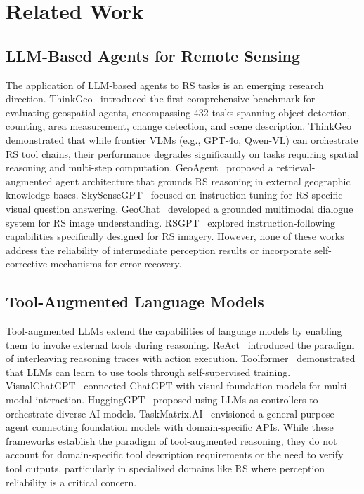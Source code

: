 \documentclass[journal]{IEEEtran}
\begin{document}
\section{Related Work}
\label{sec:related_work}

\subsection{LLM-Based Agents for Remote Sensing}

The application of LLM-based agents to RS tasks is an emerging research direction.
ThinkGeo~\cite{ThinkGeo} introduced the first comprehensive benchmark for evaluating geospatial agents, encompassing 432 tasks spanning object detection, counting, area measurement, change detection, and scene description.
ThinkGeo demonstrated that while frontier VLMs (e.g., GPT-4o, Qwen-VL) can orchestrate RS tool chains, their performance degrades significantly on tasks requiring spatial reasoning and multi-step computation.
GeoAgent~\cite{GeoAgent} proposed a retrieval-augmented agent architecture that grounds RS reasoning in external geographic knowledge bases.
SkySenseGPT~\cite{SkySenseGPT} focused on instruction tuning for RS-specific visual question answering.
GeoChat~\cite{GeoChat} developed a grounded multimodal dialogue system for RS image understanding.
RSGPT~\cite{RSGPT} explored instruction-following capabilities specifically designed for RS imagery.
However, none of these works address the reliability of intermediate perception results or incorporate self-corrective mechanisms for error recovery.

\subsection{Tool-Augmented Language Models}

Tool-augmented LLMs extend the capabilities of language models by enabling them to invoke external tools during reasoning.
ReAct~\cite{ReAct} introduced the paradigm of interleaving reasoning traces with action execution.
Toolformer~\cite{Toolformer} demonstrated that LLMs can learn to use tools through self-supervised training.
VisualChatGPT~\cite{VisualChatGPT} connected ChatGPT with visual foundation models for multi-modal interaction.
HuggingGPT~\cite{HuggingGPT} proposed using LLMs as controllers to orchestrate diverse AI models.
TaskMatrix.AI~\cite{TaskMatrix} envisioned a general-purpose agent connecting foundation models with domain-specific APIs.
While these frameworks establish the paradigm of tool-augmented reasoning, they do not account for domain-specific tool description requirements or the need to verify tool outputs, particularly in specialized domains like RS where perception reliability is a critical concern.
\end{document}
